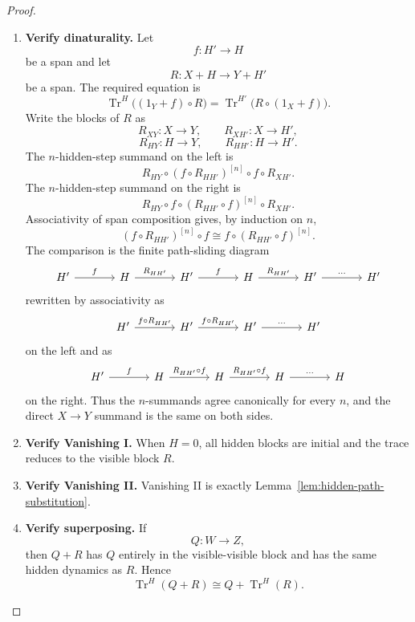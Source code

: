 \begin{proof}
\begin{enumerate}
  \item \textbf{Verify dinaturality.}
  Let
  \[
    f:H'\to H
  \]
  be a span and let
  \[
    R:X+H\to Y+H'
  \]
  be a span. The required equation is
  \[
    \operatorname{Tr}^{H}
    \bigl((1_Y+f)\circ R\bigr)
    =
    \operatorname{Tr}^{H'}
    \bigl(R\circ(1_X+f)\bigr).
  \]
  Write the blocks of \(R\) as
  \[
    R_{XY}:X\to Y,\qquad R_{XH'}:X\to H',
  \]
  \[
    R_{HY}:H\to Y,\qquad R_{HH'}:H\to H'.
  \]
  The \(n\)-hidden-step summand on the left is
  \[
    R_{HY}
    \circ
    (f\circ R_{HH'})^{[n]}
    \circ
    f
    \circ
    R_{XH'}.
  \]
  The \(n\)-hidden-step summand on the right is
  \[
    R_{HY}
    \circ
    f
    \circ
    (R_{HH'}\circ f)^{[n]}
    \circ
    R_{XH'}.
  \]
  Associativity of span composition gives, by induction on \(n\),
  \[
    (f\circ R_{HH'})^{[n]}\circ f
    \cong
    f\circ(R_{HH'}\circ f)^{[n]}.
  \]
  The comparison is the finite path-sliding diagram
  \[
  \begin{tikzcd}[column sep=large,row sep=large]
    H'
      \ar[r,"f"]
    &
    H
      \ar[r,"R_{HH'}"]
    &
    H'
      \ar[r,"f"]
    &
    H
      \ar[r,"R_{HH'}"]
    &
    H'
      \ar[r,"\cdots"]
    &
    H'
  \end{tikzcd}
  \]
  rewritten by associativity as
  \[
  \begin{tikzcd}[column sep=large,row sep=large]
    H'
      \ar[r,"f\circ R_{HH'}"]
    &
    H'
      \ar[r,"f\circ R_{HH'}"]
    &
    H'
      \ar[r,"\cdots"]
    &
    H'
  \end{tikzcd}
  \]
  on the left and as
  \[
  \begin{tikzcd}[column sep=large,row sep=large]
    H'
      \ar[r,"f"]
    &
    H
      \ar[r,"R_{HH'}\circ f"]
    &
    H
      \ar[r,"R_{HH'}\circ f"]
    &
    H
      \ar[r,"\cdots"]
    &
    H
  \end{tikzcd}
  \]
  on the right. Thus the \(n\)-summands agree canonically for every \(n\),
  and the direct \(X\to Y\) summand is the same on both sides.

  \item \textbf{Verify Vanishing I.}
  When \(H=0\), all hidden blocks are initial and the trace reduces to the
  visible block \(R\).

  \item \textbf{Verify Vanishing II.}
  Vanishing II is exactly Lemma~\ref{lem:hidden-path-substitution}.

  \item \textbf{Verify superposing.}
  If
  \[
    Q:W\to Z,
  \]
  then \(Q+R\) has \(Q\) entirely in the visible-visible block and has the
  same hidden dynamics as \(R\). Hence
  \[
    \operatorname{Tr}^{H}(Q+R)
    \cong
    Q+\operatorname{Tr}^{H}(R).
  \]


\end{enumerate}
\end{proof}
